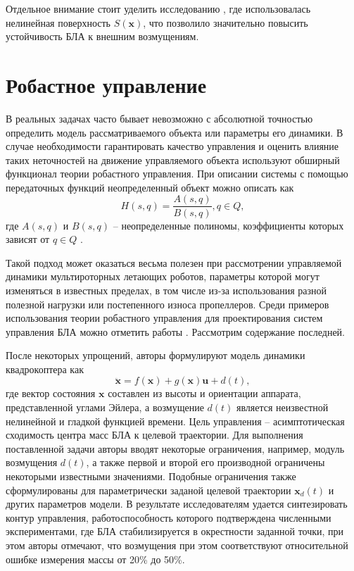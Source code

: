 Отдельное внимание стоит уделить исследованию \cite{Sumantri01}, где использовалась нелинейная поверхность $S(\bm x)$, что позволило значительно повысить устойчивость БЛА к внешним возмущениям.

\section{Робастное управление}

В реальных задачах часто бывает невозможно с абсолютной точностью определить модель рассматриваемого объекта или параметры его динамики.
В случае необходимости гарантировать качество управления и оценить влияние таких неточностей на движение управляемого объекта используют обширный функционал теории робастного управления.
При описании системы с помощью передаточных функций неопределенный объект можно описать как
\begin{equation} \label{eq:robust_ctrl_obj}
H(s, q) = \frac{A(s, q)}{B(s, q)}, q \in Q,
\end{equation}
где $A(s, q)$ и $B(s, q)$ -- неопределенные полиномы, коэффициенты которых зависят от $q \in Q$ \cite{Polyak01}. 

Такой подход может оказаться весьма полезен при рассмотрении управляемой динамики
мультироторных летающих роботов, параметры которой могут изменяться в известных пределах, в том числе из-за использования разной полезной нагрузки или постепенного износа пропеллеров. Среди примеров использования теории робастного управления для проектирования систем управления БЛА можно отметить работы \cite{Lee02, Borisov01, Petranevsky01, Bai01, Tony01}. Рассмотрим содержание последней.

После некоторых упрощений, авторы формулируют модель динамики квадрокоптера как 
\begin{equation} \label{eq:Tony_dyn}
\ddot{\bm x} = f(\bm x) + g( \bm x) \bm u + d(t),
\end{equation}
где вектор состояния $\bm x$ составлен из высоты и ориентации аппарата, представленной углами Эйлера, а возмущение $d(t)$ является неизвестной нелинейной и гладкой функцией времени. Цель управления -- асимптотическая сходимость центра масс БЛА к целевой траектории. Для выполнения поставленной задачи авторы вводят некоторые ограничения, например, модуль возмущения $d(t)$, а также первой и второй его производной ограничены некоторыми известными значениями. Подобные ограничения также сформулированы для параметрически заданой целевой траектории $\bm x_d(t)$ и других параметров модели. В результате исследователям удается синтезировать контур управления, работоспособность которого подтверждена численными экспериментами, где БЛА стабилизируется в окрестности заданной точки, при этом авторы отмечают, что возмущения при этом соответствуют относительной ошибке измерения массы от 20\% до 50\%.

